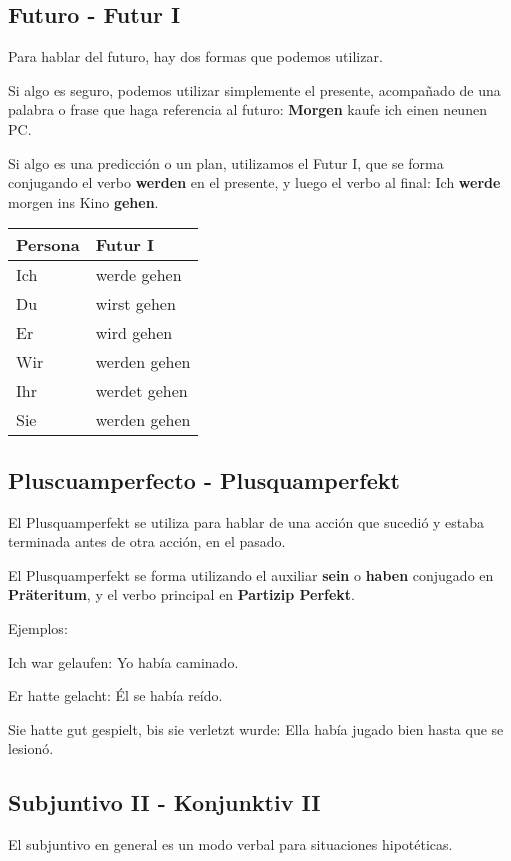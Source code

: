 \subsection{Futuro - Futur I}
Para hablar del futuro, hay dos formas que podemos utilizar.

Si algo es seguro, podemos utilizar simplemente el presente, acompañado de una palabra o frase que haga referencia al futuro: \textbf{Morgen} kaufe ich einen neunen PC.

Si algo es una predicción o un plan, utilizamos el Futur I, que se forma conjugando el verbo \textbf{werden} en el presente, y luego el verbo al final: Ich \textbf{werde} morgen ins Kino \textbf{gehen}.

\begin{tabular}{|l|l|}
\hline
\textbf{Persona} & \textbf{Futur I}\\
\hline
Ich & werde gehen  \\
Du  & wirst gehen  \\
Er  & wird gehen   \\
Wir & werden gehen \\
Ihr & werdet gehen \\
Sie & werden gehen \\
\hline
\end{tabular}


\subsection{Pluscuamperfecto - Plusquamperfekt}
El Plusquamperfekt se utiliza para hablar de una acción que sucedió y estaba terminada antes de otra acción, en el pasado.


El Plusquamperfekt se forma utilizando el auxiliar \textbf{sein} o \textbf{haben} conjugado en \textbf{Präteritum}, y el verbo principal en \textbf{Partizip Perfekt}. 

Ejemplos: 

Ich war gelaufen: Yo había caminado.

Er hatte gelacht: Él se había reído.

Sie hatte gut gespielt, bis sie verletzt wurde: Ella había jugado bien hasta que se lesionó.


\subsection{Subjuntivo II - Konjunktiv II}
El subjuntivo en general es un modo verbal para situaciones hipotéticas.

